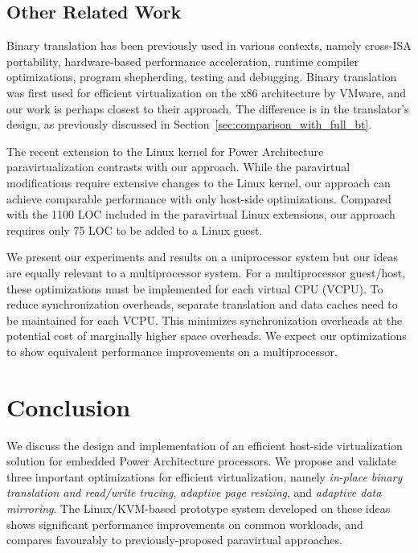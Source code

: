 \documentclass[10pt,twocolumn]{article}
\begin{document}
\subsection{Other Related Work}
Binary translation has been previously used in various contexts, namely
cross-ISA portability\cite{bansal:osdi08, qemu:software}, hardware-based
performance acceleration\cite{transmeta_crusoe:chip}, runtime compiler
optimizations\cite{bala00dynamo}, program shepherding\cite{bruening04thesis},
testing and debugging\cite{valgrind}. Binary translation was
first used for efficient virtualization on the x86 architecture by
VMware\cite{adams:asplos06}, and our work
is perhaps closest to their approach. The difference is in the translator's design,
as previously discussed in Section~\ref{sec:comparison_with_full_bt}.

The recent extension to the Linux kernel for Power Architecture paravirtualization
contrasts with our approach. While the paravirtual modifications require extensive
changes to the Linux kernel, our approach can achieve comparable performance
with only host-side optimizations. Compared with the 1100 LOC included in the
paravirtual Linux extensions, our approach requires only 75 LOC to be added to
a Linux guest.

We present our experiments and results on a uniprocessor system but our
ideas are equally relevant to a multiprocessor system. For a multiprocessor
guest/host, these optimizations must be implemented for each virtual CPU (VCPU).
To reduce synchronization
overheads, separate translation and data caches need to be maintained for each VCPU.
This minimizes synchronization overheads at the potential cost of marginally higher
space overheads. We expect
our optimizations to show equivalent performance improvements on a multiprocessor.
\section{Conclusion}
\label{sec:conclusion}
We discuss the design and implementation of an efficient host-side virtualization
solution
for embedded Power Architecture processors. We propose and validate three important
optimizations
for efficient virtualization, namely {\em in-place binary translation and read/write
tracing}, {\em adaptive page resizing}, and {\em adaptive data mirroring}. 
The Linux/KVM-based prototype system developed on these ideas shows significant
performance improvements on common workloads, and compares favourably to
previously-proposed paravirtual approaches.


\end{document}
